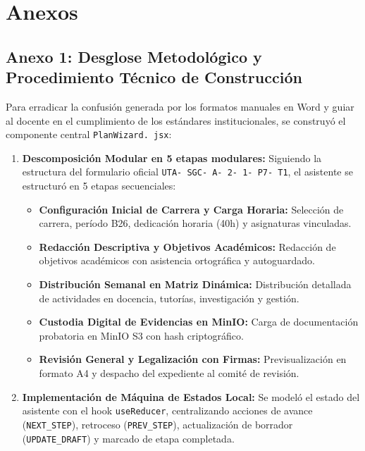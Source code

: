 \documentclass[12pt,a4paper]{article}
\begin{document}
\vspace{0.4cm}

\section{Anexos}

\subsection*{Anexo 1: Desglose Metodológico y Procedimiento Técnico de Construcción}
Para erradicar la confusión generada por los formatos manuales en Word y guiar al docente en el cumplimiento de los estándares institucionales, se construyó el componente central \texttt{PlanWizard. jsx}:

\begin{enumerate}[leftmargin=1.5em, itemsep=3pt]
    \item \textbf{Descomposición Modular en 5 etapas modulares:} Siguiendo la estructura del formulario oficial \texttt{UTA- SGC- A- 2- 1- P7- T1}, el asistente se estructuró en 5 etapas secuenciales:
    \begin{itemize}[leftmargin=1.2em, itemsep=2pt]
        \item \textbf{Configuración Inicial de Carrera y Carga Horaria:} Selección de carrera, período B26, dedicación horaria (40h) y asignaturas vinculadas.
        \item \textbf{Redacción Descriptiva y Objetivos Académicos:} Redacción de objetivos académicos con asistencia ortográfica y autoguardado.
        \item \textbf{Distribución Semanal en Matriz Dinámica:} Distribución detallada de actividades en docencia, tutorías, investigación y gestión.
        \item \textbf{Custodia Digital de Evidencias en MinIO:} Carga de documentación probatoria en MinIO S3 con hash criptográfico.
        \item \textbf{Revisión General y Legalización con Firmas:} Previsualización en formato A4 y despacho del expediente al comité de revisión.
    \end{itemize}
    \item \textbf{Implementación de Máquina de Estados Local:} Se modeló el estado del asistente con el hook \texttt{useReducer}, centralizando acciones de avance (\texttt{NEXT\_\allowbreak  STEP}), retroceso (\texttt{PREV\_\allowbreak  STEP}), actualización de borrador (\texttt{UPDATE\_\allowbreak  DRAFT}) y marcado de etapa completada.

\end{enumerate}
\end{document}
